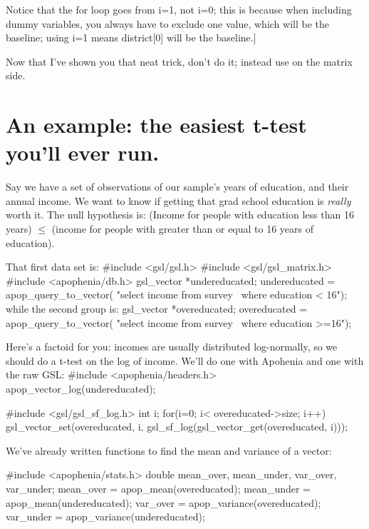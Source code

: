 Notice that the for loop goes from i=1, not i=0; this is because when including
dummy variables, you always have to exclude one value, which will be the baseline;
using i=1 means district[0] will be the baseline.]

Now that I've shown you that neat trick, don't do it; instead use
 on the matrix side.

\section{An example: the easiest t-test you'll ever run.}
Say we have a set of observations of our sample's years of education, and their annual income. We want to
know if getting that grad school education is {\it really} worth it. The null hypothesis is: (Income for
people with education less than 16 years) $\leq$ (income for people with greater than or equal to 16 years
of education).

That first data set is:
#include <gsl/gsl.h>
#include <gsl/gsl_matrix.h>
#include <apophenia/db.h>
gsl_vector	*undereducated;
   undereducated = apop_query_to_vector(
      "select income from survey \
      where education < 16");
while the second group is:
gsl_vector	*overeducated;
   overeducated = apop_query_to_vector(
      "select income from survey \
      where education >=16");

Here's a factoid for you: incomes are usually distributed log-normally, so we should do a t-test on the
log of income. We'll do one with Apohenia and one with the raw GSL:
#include <apophenia/headers.h>
apop_vector_log(undereducated);

#include <gsl/gsl_sf_log.h>
int i;
for(i=0; i< overeducated->size; i++)
   gsl_vector_set(overeducated, i, 
               gsl_sf_log(gsl_vector_get(overeducated, i)));

We've already written functions to find the mean and variance of a vector:

#include <apophenia/stats.h>
double	mean_over, mean_under, var_over, var_under;
mean_over  = apop_mean(overeducated);
mean_under = apop_mean(undereducated);
var_over   = apop_variance(overeducated);
var_under  = apop_variance(undereducated);

